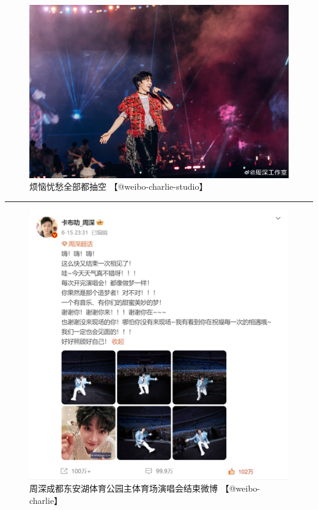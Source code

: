\documentclass[]{ctexbook}
\begin{document}
\begin{figure}

{\centering \includegraphics[width=400pt]{img/chengdu20240615/002} 

}

\caption{烦恼忧愁全部都抽空 【@weibo-charlie-studio】}\label{fig:unnamed-chunk-56}
\end{figure}

\begin{center}\rule{0.5\linewidth}{0.5pt}\end{center}

\begin{figure}

{\centering \includegraphics{img/weibo/chengdu-20240615} 

}

\caption{周深成都东安湖体育公园主体育场演唱会结束微博 【@weibo-charlie】}\label{fig:unnamed-chunk-57}
\end{figure}
\end{document}
